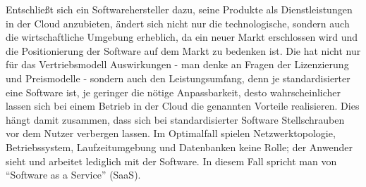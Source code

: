 Entschließt sich ein Softwarehersteller dazu, seine Produkte 
als Dienstleistungen in der Cloud anzubieten, ändert sich nicht nur die 
technologische, sondern auch die wirtschaftliche Umgebung erheblich, da ein 
neuer Markt erschlossen wird und die Positionierung der Software auf dem Markt 
zu bedenken ist. Die hat nicht nur für das Vertriebsmodell  Auswirkungen - man 
denke an Fragen der Lizenzierung und Preismodelle - sondern auch den 
Leistungsumfang, denn je standardisierter eine Software ist, je 
geringer die nötige Anpassbarkeit, desto wahrscheinlicher lassen sich bei einem 
Betrieb in der 
Cloud die genannten Vorteile realisieren.  Dies 
hängt damit zusammen, dass sich bei standardisierter Software Stellschrauben 
vor dem Nutzer verbergen lassen. Im Optimalfall spielen Netzwerktopologie, 
Betriebssystem, Laufzeitumgebung und Datenbanken keine Rolle; der Anwender 
sieht und arbeitet lediglich mit der Software. In diesem Fall spricht man von 
"`Software as a Service"' (SaaS). 


\begin{comment}
Als SaaS-Vertriebsplattform soll in dieser Arbeit schwerpunktmäßig Salesforce 
betrachtet werden, das mit "`AppExchange"' einen Marktplatz zur Verfügung 
stellt, auf dem Hersteller ihre auf der Salesforceplattform laufenden 
Anwendungen anbieten können. Die Konzentration auf Salesforce als Zielplattform 
war zum einen durch das Unternehmen gegeben, mit dem in freundlicher 
Kooperation diese Thesis entstanden ist.

\begin{figure}[bh]
\begin{center}
\begin{tikzpicture}
\begin{axis}[
/pgf/number format/.cd,
        use comma,
        1000 sep={},
    title={Umsatz von Salesforce in Mio. US-Dollar},
    xlabel={Jahr},
    ymin=0, ymax=8000,
    legend pos=north west,
    ymajorgrids=true,
    grid style=dashed
]

\addplot[color=blue,mark=square,]
    coordinates {
    (2012,2267)(2013,3050)(2014,4071)(2015,5374)(2016,6667)
    };
 
\end{axis}
\end{tikzpicture}
\caption{Umsatzzahlen entnommen aus \cite[43]{salesforceannualreport} }
\label{UmsatzzahlenSalesforce}
\end{center}
\end{figure}
Zum anderen aber gehört Salesforce neben Microsoft 
und Google zu den größten SaaS-Anbietern
\pcite{}{247}{softwareindustrie2015} und konnte zwischen 2012 und 2016 
den Umsatz mit durchschnittlich 31\% von 2,267 Milliarden US-Dollar auf 
6,667 Milliarden US-Dollar rasant steigern (Vgl. Abbildung 
~\ref{UmsatzzahlenSalesforce}). Daher dürfte es als Zielplattform für 
viele Unternehmen eine Option sein.
\end{comment}

